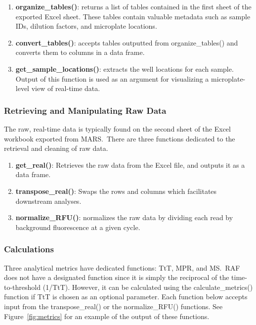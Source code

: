 \documentclass[preprint,12pt,a4paper]{elsarticle}
\begin{document}
                \begin{enumerate}
                    \item \textbf{organize\_tables()}: returns a list of tables contained in the first sheet of the exported Excel sheet. These tables contain valuable metadata such as sample IDs, dilution factors, and microplate locations.
                    \item \textbf{convert\_tables()}: accepts tables outputted from organize\_tables() and converts them to columns in a data frame.
                    \item \textbf{get\_sample\_locations()}: extracts the well locations for each sample. Output of this function is used as an argument for visualizing a microplate-level view of real-time data.
                \end{enumerate}

            \subsubsection{Retrieving and Manipulating Raw Data}
                The raw, real-time data is typically found on the second sheet of the Excel workbook exported from MARS.\ There are three functions dedicated to the retrieval and cleaning of raw data.

                \begin{enumerate}
                    \item \textbf{get\_real()}: Retrieves the raw data from the Excel file, and outputs it as a data frame.
                    \item \textbf{transpose\_real()}: Swaps the rows and columns which facilitates downstream analyses.
                    \item \textbf{normalize\_RFU()}: normalizes the raw data by dividing each read by background fluorescence at a given cycle.
                \end{enumerate}

            \subsubsection{Calculations}
                Three analytical metrics have dedicated functions: TtT, MPR, and MS.\ RAF does not have a designated function since it is simply the reciprocal of the time-to-threshold (1/TtT). However, it can be calculated using the calculate\_metrics() function if TtT is chosen as an optional parameter. Each function below accepts input from the transpose\_real() or the normalize\_RFU() functions. See Figure~\ref{fig:metrics} for an example of the output of these functions.
\end{document}

